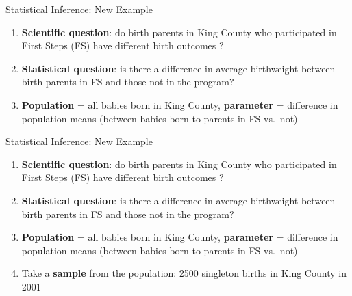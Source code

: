 \documentclass[
  ignorenonframetext,
]{beamer}
\providecommand{\tightlist}{%
  \setlength{\itemsep}{0pt}\setlength{\parskip}{0pt}}
\begin{document}
\begin{frame}{Statistical Inference: New Example}
\protect\hypertarget{statistical-inference-new-example-2}{}
\begin{enumerate}
\tightlist
\item
  \textbf{Scientific question}: do birth parents in King County who
  participated in First Steps (FS) have {different }{birth outcomes} ?
\item
  \textbf{Statistical question}: is there a {difference in average}
  {birthweight} between birth parents in FS and those not in the
  program?
\item
  \textbf{Population} = all babies born in King County,
  \textbf{parameter} = difference in population means (between babies
  born to parents in FS vs.~not)
\end{enumerate}
\end{frame}

\begin{frame}{Statistical Inference: New Example}
\protect\hypertarget{statistical-inference-new-example-3}{}
\begin{enumerate}
\tightlist
\item
  \textbf{Scientific question}: do birth parents in King County who
  participated in First Steps (FS) have {different }{birth outcomes} ?
\item
  \textbf{Statistical question}: is there a {difference in average}
  {birthweight} between birth parents in FS and those not in the
  program?
\item
  \textbf{Population} = all babies born in King County,
  \textbf{parameter} = difference in population means (between babies
  born to parents in FS vs.~not)
\item
  Take a \textbf{sample} from the population: 2500 singleton births in
  King County in 2001
\end{enumerate}
\end{frame}
\end{document}
